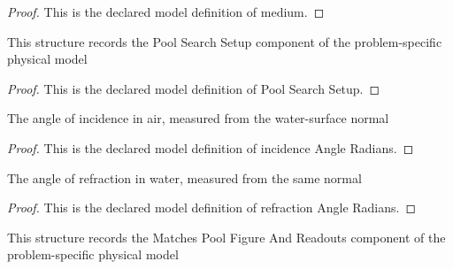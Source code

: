 \begin{proof}
  This is the declared model definition of medium.
\end{proof}
\begin{definition}
  \label{def:physics:phyx-mini-0135:phyxminiproblems-problemphyxmini0135-poolsearchsetup}
  This structure records the Pool Search Setup component of the problem-specific physical model
\end{definition}
\begin{proof}
  This is the declared model definition of Pool Search Setup.
\end{proof}
\begin{definition}
  \label{def:physics:phyx-mini-0135:phyxminiproblems-problemphyxmini0135-incidenceangleradians}
  The angle of incidence in air, measured from the water-surface normal
\end{definition}
\begin{proof}
  This is the declared model definition of incidence Angle Radians.
\end{proof}
\begin{definition}
  \label{def:physics:phyx-mini-0135:phyxminiproblems-problemphyxmini0135-refractionangleradians}
  The angle of refraction in water, measured from the same normal
\end{definition}
\begin{proof}
  This is the declared model definition of refraction Angle Radians.
\end{proof}
\begin{definition}
  \label{def:physics:phyx-mini-0135:phyxminiproblems-problemphyxmini0135-matchespoolfigureandreadouts}
  This structure records the Matches Pool Figure And Readouts component of the problem-specific physical model
\end{definition}
